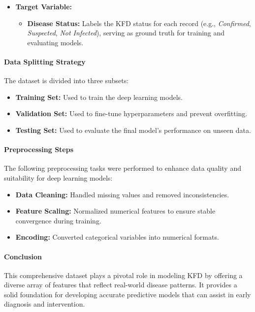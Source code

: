\documentclass[conference]{IEEEtran}
\begin{document}
\begin{itemize}
    \item \textbf{Target Variable:}
    \begin{itemize}
        \item \textbf{Disease Status:} Labels the KFD status for each record (e.g., \textit{Confirmed}, \textit{Suspected}, \textit{Not Infected}), serving as ground truth for training and evaluating models.
    \end{itemize}
\end{itemize}

\paragraph{Data Splitting Strategy}
The dataset is divided into three subsets:
\begin{itemize}
    \item \textbf{Training Set:} Used to train the deep learning models.
    \item \textbf{Validation Set:} Used to fine-tune hyperparameters and prevent overfitting.
    \item \textbf{Testing Set:} Used to evaluate the final model’s performance on unseen data.
\end{itemize}

\paragraph{Preprocessing Steps}
The following preprocessing tasks were performed to enhance data quality and suitability for deep learning models:

\begin{itemize}
    \item \textbf{Data Cleaning:} Handled missing values and removed inconsistencies.
    \item \textbf{Feature Scaling:} Normalized numerical features to ensure stable convergence during training.
    \item \textbf{Encoding:} Converted categorical variables into numerical formats.
\end{itemize}

\paragraph{Conclusion}
This comprehensive dataset plays a pivotal role in modeling KFD by offering a diverse array of features that reflect real-world disease patterns. It provides a solid foundation for developing accurate predictive models that can assist in early diagnosis and intervention.
\end{document}
